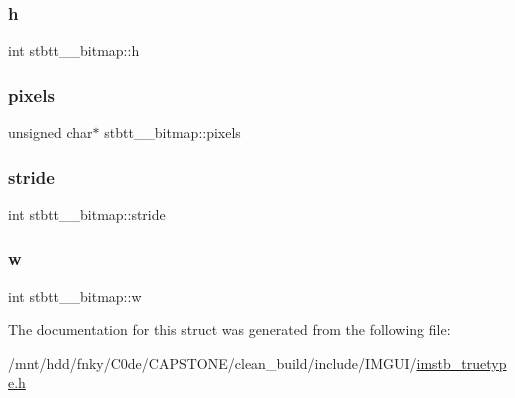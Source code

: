 \subsubsection{\texorpdfstring{h}{h}}
{\footnotesize\ttfamily int stbtt\+\_\+\+\_\+bitmap\+::h}

\mbox{\label{structstbtt____bitmap_ae6be77625faf55b110eaaffde5c7733c}} 
\subsubsection{\texorpdfstring{pixels}{pixels}}
{\footnotesize\ttfamily unsigned char$\ast$ stbtt\+\_\+\+\_\+bitmap\+::pixels}

\mbox{\label{structstbtt____bitmap_a48ee6b550ee4f1d85bfc32c62c0e9a98}} 
\subsubsection{\texorpdfstring{stride}{stride}}
{\footnotesize\ttfamily int stbtt\+\_\+\+\_\+bitmap\+::stride}

\mbox{\label{structstbtt____bitmap_afbd607426f0a457b1a871ed902eeb926}} 
\subsubsection{\texorpdfstring{w}{w}}
{\footnotesize\ttfamily int stbtt\+\_\+\+\_\+bitmap\+::w}



The documentation for this struct was generated from the following file\+:\begin{DoxyCompactItemize}
\item 
/mnt/hdd/fnky/\+C0de/\+C\+A\+P\+S\+T\+O\+N\+E/clean\+\_\+build/include/\+I\+M\+G\+U\+I/\hyperlink{imstb__truetype_8h}{imstb\+\_\+truetype.\+h}\end{DoxyCompactItemize}
